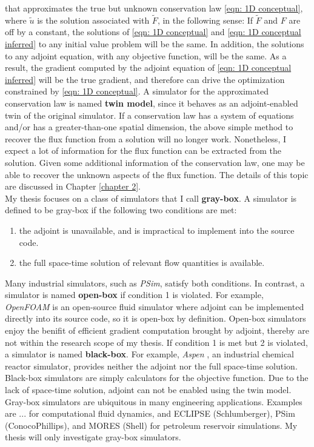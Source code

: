 that approximates the true but unknown conservation law \eqref{eqn: 1D conceptual}, where
$\tilde{u}$ is the solution associated with $\tilde{F}$, in the following sense: If $\tilde{F}$ and $F$ are off by a constant, the solutions of \eqref{eqn: 1D conceptual} 
and \eqref{eqn: 1D conceptual inferred}  to any initial value
problem will be the same. 
In addition, the solutions to any adjoint equation, with any objective function, will be the same. As a result, the gradient computed 
by the adjoint equation of \eqref{eqn: 1D conceptual inferred} will be the true gradient, and therefore can drive
the optimization constrained by \eqref{eqn: 1D conceptual}.
A simulator for the approximated conservation law is named \textbf{twin model}, since it behaves as an adjoint-enabled
twin of the original simulator.
If a conservation law has a system of equations and/or has a greater-than-one spatial dimension, 
the above simple method to recover the flux function from a solution will no longer work. 
Nonetheless, I expect a lot of information for the flux function can be extracted from the solution. 
Given some additional information of the conservation law, one may be able to recover the unknown aspects of the flux function. 
The details of this topic are discussed in Chapter \ref{chapter 2}.\\

My thesis focuses on a class of simulators that I call \textbf{gray-box}.
A simulator is defined to be gray-box if the following two conditions are met:
\begin{enumerate}
    \item the adjoint is unavailable, and is impractical to implement into the source code.
    \item the full space-time solution of relevant flow quantities is available.
\end{enumerate}
Many industrial simulators, such as \textit{PSim}, satisfy both conditions.
In contrast, a simulator is named \textbf{open-box} if condition 1 is violated.
For example, \textit{OpenFOAM} \cite{openfoam} is an open-source fluid simulator where adjoint can be implemented directly
into its source code, so it is open-box by definition. Open-box simulators enjoy the
benifit of efficient gradient computation brought by adjoint, thereby are not within the research
scope of my thesis. If condition 1 is met but 2 is violated, a simulator
is named \textbf{black-box}. For example, \textit{Aspen} \cite{aspen}, an industrial chemical reactor simulator, provides neither
the adjoint nor the full space-time solution. Black-box simulators are simply calculators
for the objective function. Due to the lack of space-time solution, adjoint can not be enabled
using the twin model. 
Gray-box simulators are ubiquitous in many engineering applications. Examples are ... for computational fluid
dynamics, and ECLIPSE (Schlumberger), PSim (ConocoPhillips), and MORES (Shell) for petroleum reservoir simulations.
My thesis will only investigate gray-box simulators.\\


